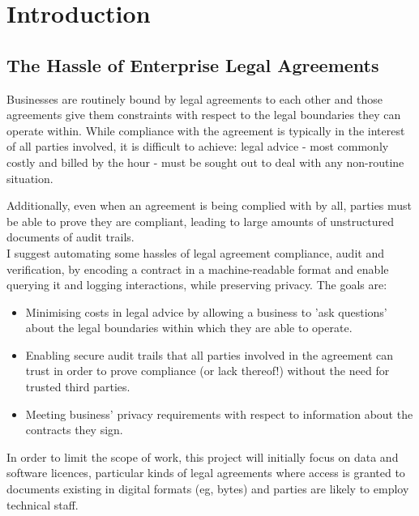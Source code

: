 \chapter{Introduction}\label{ch:introduction}

\section*{The Hassle of Enterprise Legal Agreements}\label{sec:intro:legal-hassle}

Businesses are routinely bound by legal agreements to each other and those agreements give them
constraints with respect to the legal boundaries they can operate within.
While compliance with the agreement is typically in the interest of all parties involved, it is
difficult to achieve: legal advice - most commonly costly and billed by the hour - must be sought
out to deal with any non-routine situation.

Additionally, even when an agreement is being complied with by all, parties must be able to prove
they are compliant, leading to large amounts of unstructured documents of audit trails.\\

I suggest automating some hassles of legal agreement compliance, audit and verification, by encoding
a contract in a machine-readable format and enable querying it and logging interactions, while
preserving privacy.
The goals are:
\begin{itemize}
    \item Minimising costs in legal advice by allowing a business to 'ask questions' about the legal
    boundaries within which they are able to operate.
    \item Enabling secure audit trails that all parties involved in the agreement can trust in order
    to prove compliance (or lack thereof!) without the need for trusted third parties.
    \item Meeting business' privacy requirements with respect to information about the contracts
    they sign.
\end{itemize}

In order to limit the scope of work, this project will initially focus on data and software
licences, particular kinds of legal agreements where access is granted to documents existing in
digital formats (eg, bytes) and parties are likely to employ technical staff.
